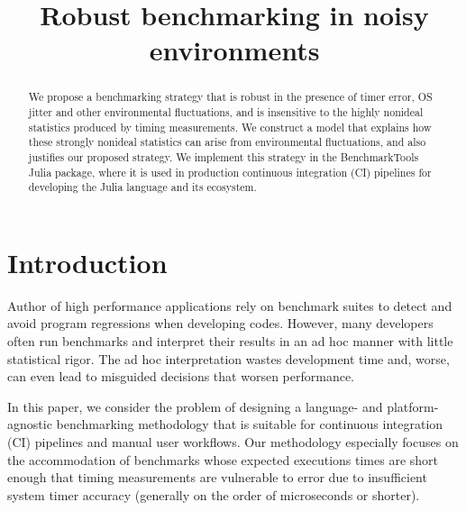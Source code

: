 \documentclass[conference]{IEEEtran}
\begin{document}
\title{Robust benchmarking in noisy environments}

\author{
}

\maketitle

\begin{abstract}
We propose a benchmarking strategy that is robust in the presence of timer
error, OS jitter and other environmental fluctuations, and is insensitive to
the highly nonideal statistics produced by timing measurements.
We construct a model that explains how these strongly nonideal statistics can
arise from environmental fluctuations, and also justifies our proposed
strategy. We implement this strategy in the BenchmarkTools Julia package, where
it is used in production continuous integration (CI) pipelines for developing
the Julia language and its ecosystem.
\end{abstract}

\IEEEpeerreviewmaketitle

\section{Introduction}
\label{sec:intro}

Author of high performance applications rely on benchmark suites to
detect and avoid program regressions when developing codes. However, many
developers often run benchmarks and interpret their results in an ad hoc
manner with little statistical rigor. The ad hoc interpretation wastes
development time and, worse, can even lead to misguided decisions that worsen
performance.

In this paper, we consider the problem of designing a language- and
platform-agnostic benchmarking methodology that is suitable for continuous
integration (CI) pipelines and manual user workflows. Our methodology
especially focuses on the accommodation of benchmarks whose expected executions
times are short enough that timing measurements are vulnerable to error due to
insufficient system timer accuracy (generally on the order of microseconds or
shorter).
\end{document}
